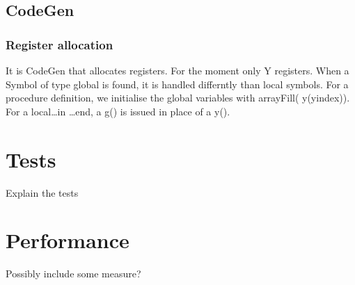 \documentclass[draft,a4paper]{memoir}
\begin{document}
\subsection{CodeGen}
\subsubsection{Register allocation}
It is CodeGen that allocates registers. For the moment only Y registers.
When a Symbol of type global is found, it is handled differntly than local symbols.
For a procedure definition, we initialise the global variables with arrayFill( y(yindex)). 
For a local\ldots in \ldots end, a g() is issued in place of a y(). 

\section{Tests}
Explain the tests

\section{Performance}
Possibly include some measure?
\end{document}
